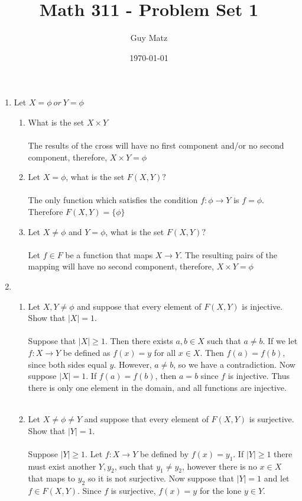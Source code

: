 \documentclass[11pt]{article}
\title{\textbf{Math 311 - Problem Set 1}}
\author{Guy Matz}
\date{\today}
\begin{document}
\maketitle

\newpage

\begin{enumerate}  %
\item Let $X = \phi \ or \ Y = \phi$

\begin{enumerate} %
\item What is the set $X \times Y$\\ \\
The results of the cross will have no first component and/or no second component, therefore, $X \times Y = \phi$\\
\item Let $X = \phi$, what is the set $F(X,Y)?$\\\\
The only function which satisfies the condition $f : \phi \to Y$ is $f = \phi$.  Therefore $F(X,Y) = \{\phi\}$\\
\item Let $X \neq \phi$ and $Y = \phi$, what is the set $F(X,Y)?$\\ \\
Let $f \in F$ be a function that maps $X \to Y$.  The resulting pairs of the mapping will have no second component, therefore, $X \times Y = \phi$\\
\end{enumerate} %

\newpage

\item

\begin{enumerate} %
\item Let $X, Y \neq \phi$ and suppose that every element of $F(X,Y)$ is injective.  Show that $|X| = 1$.
\\ \\
Suppose that $|X| \geq 1$.  Then there exists $a,b \in X$ such that $a \neq b$.  If we let $f: X \to Y$ be defined as $f(x) = y$ for all $x \in X$.  Then $f(a) = f(b)$, since both sides equal $y$.  However, $a \neq b$, so we have a contradiction.
Now suppose $|X| = 1$.  If $f(a) = f(b)$, then $a = b$ since $f$ is injective.  Thus there is only one element in the domain, and all functions are injective.
\\ \\
\item Let $X \neq \phi \neq Y$ and suppose that every element of $F(X,Y)$ is surjective.  Show that $|Y| = 1$.
\\ \\
Suppose $|Y| \geq 1.$  Let $f : X \to Y$ be defined by $f(x) = y_1$.  If $|Y| \geq 1$ there must exist another $Y, y_2$, such that $y_1 \neq y_2$, however there is no $x \in X$ that maps to $y_2$ so it is not surjective.  Now suppose that $|Y| = 1$ and let $f \in F(X,Y)$.  Since $f$ is surjective, $f(x) = y$ for the lone $y \in Y$. 
\\


\end{enumerate}
\end{enumerate}
\end{document}
